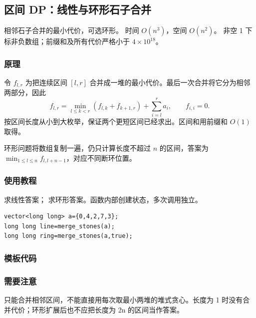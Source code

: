 \subsection{区间 DP：线性与环形石子合并}
\label{dp:interval-merge}
\AlgorithmInfo
    {相邻石子合并的最小代价，可选环形。}
    {时间 $O(n^3)$，空间 $O(n^2)$。}
    {非空 1 下标非负数组；前缀和及所有代价严格小于 $4\times10^{18}$。}
\subsubsection*{原理}

令 $f_{l,r}$ 为把连续区间 $[l,r]$ 合并成一堆的最小代价。最后一次合并将它分为相邻两部分，因此
\[
 f_{l,r}=\min_{l\le k<r}(f_{l,k}+f_{k+1,r})+\sum_{i=l}^r a_i,
 \qquad f_{i,i}=0.
\]
按区间长度从小到大枚举，保证两个更短区间已经求出。区间和用前缀和 $O(1)$ 取得。

环形问题将数组复制一遍，仍只计算长度不超过 $n$ 的区间，答案为 $\min_{1\le l\le n}f_{l,l+n-1}$，对应不同断环位置。

\subsubsection*{使用教程}
 求线性答案； 求环形答案。函数内部创建状态，多次调用独立。
\begin{lstlisting}[style=mtycpp,numbers=none]
vector<long long> a={0,4,2,7,3};
long long line=merge_stones(a);
long long ring=merge_stones(a,true);
\end{lstlisting}
\subsubsection*{模板代码}
\subsubsection*{需要注意}
只能合并相邻区间，不能直接用每次取最小两堆的堆式贪心。长度为 1 时没有合并代价；环形扩展后也不应把长度为 2n 的区间当作答案。
